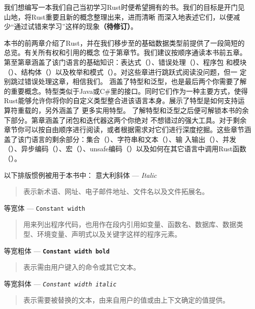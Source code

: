 
我们想编写一本我们自己当初学习Rust时便希望拥有的书。我们的目标是开门见山地，将Rust重要且新的概念整理出来，进而清晰
而深入地表述它们，以便减少“通过试错来学习”这样的现象\textbf{（待修订）}。


本书的前两章介绍了Rust，并在我们移步至的基础数据类型前提供了一段简短的总览。有关所有权和引用的概念
位于第章节。我们建议按顺序通读本书前五章。
第至第章涵盖了该门语言的基础知识：表达式（）、错误处理（）、程序包
和模块（）、结构体（）以及枚举和模式（）。对这些章进行跳跃式阅读没问题，但一
定别跳过错误处理这章，相信我们。
涵盖了特型和泛型，也是最后两个你需要了解的重要概念。特型类似于Java或C\#里的接口。同时它们作为一种主要方式，使得
Rust能够允许你将你的自定义类型整合进该语言本身。展示了特型是如何支持运算符重载的，另外涵盖了
更多实用特型。
了解特型和泛型之后便可解锁本书的余下部分。第章涵盖了闭包和迭代器这两个你绝对
不想错过的强大工具。对于剩余章节你可以按自由顺序进行阅读，或者根据需求对它们进行深度挖掘。这些章节涵盖了该门语言的剩余部分：集合（）、字符串和文本（）、输
入输出（）、并发（）、异步编码（）、宏（）、unsafe编码（）以及如何在其它语言中调用Rust函数（）。


以下排版惯例被用于本书中：
意大利斜体 --- \textit{Italic}
    \begin{quote}
        表示新术语、网址、电子邮件地址、文件名以及文件拓展名。
    \end{quote}
等宽体 --- \texttt{Constant width}
    \begin{quote}
        用来列出程序代码，也用作在段内引用如变量、函数名、数据库、数据类型、环境变量、声明式以及关键字这样的程序元素。
    \end{quote}
等宽粗体 --- \texttt{\textbf{Constant width bold}}
    \begin{quote}
        表示需由用户键入的命令或其它文本。
    \end{quote}
等宽斜体 --- \textit{\texttt{Constant width italic}}
    \begin{quote}
        表示需要被替换的文本，由来自用户的值或由上下文确定的值提供。
    \end{quote}

